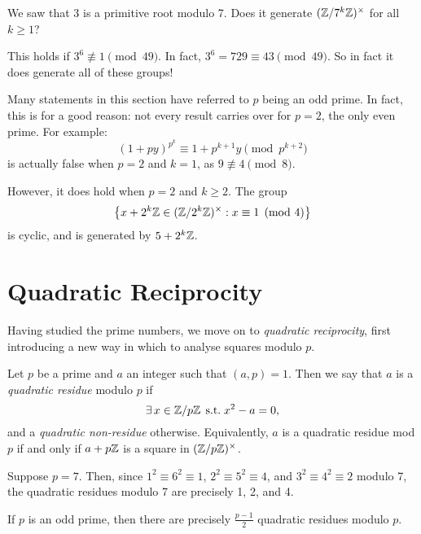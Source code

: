 \documentclass{article}
\begin{document}
\begin{example}
    We saw that 3 is a primitive root modulo 7. Does it generate $(\mathbb{Z}/7^k\mathbb{Z})^\times$ for all $k \geq 1$?
    
    This holds if $3^6 \not\equiv 1 \pmod{49}$. In fact, $3^6 = 729 \equiv 43 \pmod{49}$. So in fact it does generate all of these groups!
\end{example}

\begin{remark}
	Many statements in this section have referred to $p$ being an odd prime. In fact, this is for a good reason: not every result carries over for $p = 2$, the only even prime. For example:
	\[
	(1 + py)^{p^k} \equiv 1 + p^{k+1} y \pmod{p^{k+2}}
	\]
	is actually false when $p = 2$ and $k = 1$, as $9 \not\equiv 4 \pmod{8}$.
	
	However, it does hold when $p = 2$ and $k \geq 2$. The group
	\[
	\left\lbrace x + 2^k \mathbb{Z} \in (\mathbb{Z}/2^k\mathbb{Z})^\times : x \equiv 1 \pmod{4} \right\rbrace
	\]
	is cyclic, and is generated by $5 + 2^k \mathbb{Z}$.
\end{remark}


\pagebreak
\section{Quadratic Reciprocity}

Having studied the prime numbers, we move on to \textit{quadratic reciprocity}, first introducing a new way in which to analyse squares modulo $p$.

\begin{definition}
    Let $p$ be a prime and $a$ an integer such that $(a, p) = 1$. Then we say that $a$ is a \textit{quadratic residue} modulo $p$ if
    \[
	\exists \, x \in \mathbb{Z}/p\mathbb{Z} \mathrel{\, \text{s.t.}} x^2 - a = 0,
	\]
	and a \textit{quadratic non-residue} otherwise. Equivalently, $a$ is a quadratic residue mod $p$ if and only if $a + p\mathbb{Z}$ is a square in $(\mathbb{Z}/p\mathbb{Z})^\times$.
\end{definition}

\begin{note}
	Suppose $p = 7$. Then, since $1^2 \equiv 6^2 \equiv 1$, $2^2 \equiv 5^2 \equiv 4$, and $3^2 \equiv 4^2 \equiv 2$ modulo 7, the quadratic residues modulo 7 are precisely 1, 2, and 4.
\end{note}

\begin{proposition}
    If $p$ is an odd prime, then there are precisely $\frac{p-1}{2}$ quadratic residues modulo $p$.
\end{proposition}
\end{document}
